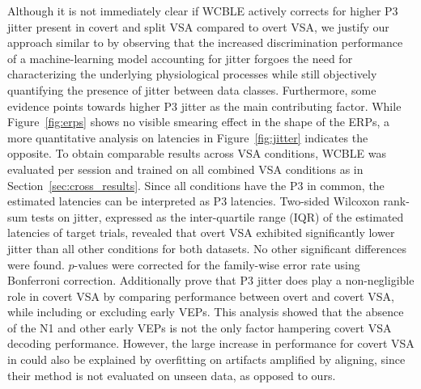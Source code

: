 Although it is not immediately clear if WCBLE actively corrects for higher P3 jitter
present in covert and split VSA compared to overt VSA,
we justify our approach similar to \cite{Hardiansyah2020} by
observing that the increased discrimination performance of a machine-learning
model accounting for jitter forgoes the need for characterizing the underlying
physiological processes while still objectively quantifying the presence of
jitter between data classes.
Furthermore, some evidence points towards higher P3 jitter as the main
contributing factor.
While Figure~\ref{fig:erps} shows no visible smearing effect in
the shape of the ERPs, a more quantitative analysis on latencies in
Figure~\ref{fig:jitter} indicates the opposite.
To obtain comparable results across VSA conditions, WCBLE was
evaluated per session and trained on all combined VSA conditions as in
Section~\ref{sec:cross_results}.
Since all conditions have the P3 in common, the estimated latencies can be
interpreted as P3 latencies.
Two-sided Wilcoxon rank-sum tests on jitter, expressed as the inter-quartile
range (IQR) of the estimated latencies of target trials, revealed that overt
VSA exhibited significantly lower jitter than all other conditions for both datasets.
No other significant differences were found.
$p$-values were corrected for the family-wise error rate using Bonferroni
correction.
Additionally \cite{Arico2014} prove that P3 jitter does play a
non-negligible role in covert VSA by comparing performance between
overt and covert VSA, while including or excluding early VEPs.
This analysis showed that the absence of the N1 and other early VEPs is not the
only factor hampering covert VSA decoding performance.
However, the large increase in performance for covert VSA in \cite{Arico2014} could also
be explained by overfitting on artifacts amplified by aligning, since their
method is not evaluated on unseen data, as opposed to ours.


